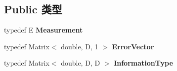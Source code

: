 \subsection*{Public 类型}
\begin{DoxyCompactItemize}
\item 
\hypertarget{classg2o_1_1BaseEdge_a2c148abba650a20b8c7eed75d3e2211e}{typedef E {\bfseries Measurement}}\label{classg2o_1_1BaseEdge_a2c148abba650a20b8c7eed75d3e2211e}

\item 
\hypertarget{classg2o_1_1BaseEdge_af5b558dd24e4be2e437563cae4b3550d}{typedef Matrix$<$ double, D, 1 $>$ {\bfseries Error\-Vector}}\label{classg2o_1_1BaseEdge_af5b558dd24e4be2e437563cae4b3550d}

\item 
\hypertarget{classg2o_1_1BaseEdge_a2e5a33343ac3f189d8a7d5ee4d8b73fc}{typedef Matrix$<$ double, D, D $>$ {\bfseries Information\-Type}}\label{classg2o_1_1BaseEdge_a2e5a33343ac3f189d8a7d5ee4d8b73fc}

\end{DoxyCompactItemize}
